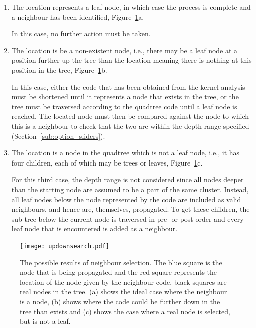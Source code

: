 \begin{enumerate}
	\item The location represents a leaf node, in which case the process is
		complete and a neighbour has been identified,
		Figure~\ref{fig:updownsearch}a.

		In this case, no further action must be taken.

	\item The location is be a non-existent node, i.e., there may be a leaf
		node at a position further up the tree than the location meaning there
		is nothing at this position in the tree,
		Figure~\ref{fig:updownsearch}b.

		In this case, either the code that has been obtained from the kernel
		analysis must be shortened until it represents a node that exists in
		the tree, or the tree must be traversed according to the quadtree code
		until a leaf node is reached. The located node must then be compared
		against the node to which this is a neighbour to check that the two are
		within the depth range specified (Section~\ref{sub:option_sliders}).

	\item The location is a node in the quadtree which is not a leaf node,
		i.e., it has four children, each of which may be trees or leaves,
		Figure~\ref{fig:updownsearch}c.

		For this third case, the depth range is not considered since all nodes
		deeper than the starting node are assumed to be a part of the same
		cluster. Instead, all leaf nodes below the node represented by the code
		are included as valid neighbours, and hence are, themselves,
		propagated. To get these children, the sub-tree below the current node
		is traversed in pre- or post-order and every leaf node that is
		encountered is added as a neighbour.

\end{enumerate}

\begin{figure}[tbh]
	\centering
	\texttt{[image: updownsearch.pdf]}
	\caption[Possible results of neighbour selection.]{The possible results of
		neighbour selection. The blue square is the node that is being
		propagated and the red square represents the location of the node given
		by the neighbour code, black squares are real nodes in the tree. (a)
		shows the ideal case where the neighbour is a node, (b) shows where the
		code could be further down in the tree than exists and (c) shows the
		case where a real node is selected, but is not a leaf.}\label{fig:updownsearch}
\end{figure}
